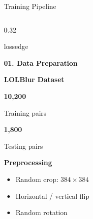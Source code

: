 \documentclass[
    11pt,%
    aspectratio=169,%
]{beamer}
\begin{document}

\begin{frame}{Training Pipeline}

\scriptsize


\begin{columns}[T,onlytextwidth]


\begin{column}{0.32\textwidth}

\begin{beamercolorbox}[
    wd=\linewidth,
    sep=0.09cm,
    rounded=true,
    center
]{lossedge}

    {\color{LossNavy}\bfseries 01. Data Preparation}

\end{beamercolorbox}

\vspace{0.10cm}

{\color{LossNavy}\bfseries LOLBlur Dataset}

\vspace{0.02cm}

{\color{LossNavy}\bfseries\Large 10,200}

Training pairs

\vspace{0.05cm}

{\color{LossNavy}\bfseries\Large 1,800}

Testing pairs

\vspace{0.10cm}

\textbf{Preprocessing}

\begin{itemize}
    \setlength{\itemsep}{1pt}
    \setlength{\topsep}{2pt}
    \item Random crop: $384\times384$
    \item Horizontal / vertical flip
    \item Random rotation
\end{itemize}

\end{column}



\end{columns}
\end{frame}
\end{document}
